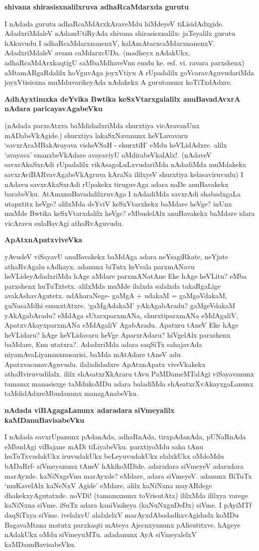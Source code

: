 {\bf shivana shirasisxnalilxruva adhaRcaMdarxda gurutu}

I nAdada gurutu adhaRcaMdArxkAraveMdu hiMdeyeV tiLisidAdxgide. AdadxriMdaleV nAdamUtiRyAda shivana shirasisxnalilx- jaTeyalilx gurutu hAkuvudu I adhaRcaMdarxnanenxV, kalAmAtarxcaMdarxnanenxV. AdadxriMdaleV avanu caMdarxcUDa. (madheyx nAdakUkx, adhaRcaMdArxkaqtigU saMbaMdhaveVnu emdu ke. esf. vi. ravara parxshenx) aMtamARgaRdalilx hoVguvAga joyxVtiyu A rUpadalilx goVcaravAguvudariMda joyxVtisisxna muMduvarikeyAda nAdakekx A gurutanunx koTiTxdAdxre.

{\bf AdhAyxtimxka deYvika Bwtika keSxVtarxgalalilx anuBavadAvxrA nAdara paricayavAgabeVku}

(nAdada parxsAtxva baMdidadxriMda shurxtiya vicAravanUnx mADabeVkAgide.) shurxtiya lakaSxNavanunx heVLuvavaru `savxrAraMBakAvayava visheVSaH - shurxtiH' eMdu heVLidAdxre. alilx `avayava' enanxbeVkAdare avayaviyU oMdirabeVkalAlx!. (nAdaveV savxrAkaSxrAdi rUpadalilx vikAsagoLuLxvudariMda nAdadiMda muMdakekx savxrAviBARvavAgabeVkAgruva kAraNa ililxyeV shurxtiya kelasaviruvudu) I nAdavu savxrAkaSxrAdi rUpakekx tiruguvAga adara naDe anuBavakekx barabeVku. AtAmxnuBavadalilxruvAga I nAdadiMda savxrAdi shabadxgaLa utapxtitx heVge? alilxMda deYviV keSxVtarxkekx baMdare heVge? inUnx muMde Bwtika keSxVtarxdalilx heVge? eMbudelAlx anuBavakekx baMdare idara vicAravu sulaBavAgi athaRvAguvudu.

{\bf ApAtxnApatxviveVka}

yAvudeV viSayavU anuBavakekx baMdAga adara neYsagiRkate, neYjate athaRvAgalu sAdhayx. adanunx biTutx keVvala parxmANavu heVLideyAdadxriMda hAge aMdare parxmANatAne Eke hAge heVLitu? eMba parxshenx huTuTxtetx. alilxMda muMde ilalxda salalxda takaRgaLige avakAshavAgutetx. udAharaNege- gaMgA + udakaM = gaMgoVdakaM, guNasaMdhi enunxtAtxre. `gaMgAdakaM' yAkAgabAradu? gaMgeVdakaM yAkAgabAradu? eMdAga sUtarxparxmANa, shurxtiparxmANa eMdAgaliV, ApatxvAkayxparxmANa eMdAgaliV AgabAradu. Apatxru tAneV Eke hAge heVLidaru? hAge heVLidavaru heVge AparxrAdaru? hiVgelAlx parxshenx baMdare, Enu utatxra?. AdadxriMda adara saqSiTx sahajavAda niyamAvaLiyananxnusarisi, baMda mAtAdare tAneV adu ApatxvacanavAguvudu. ilalxdidadxre ApAtxnApatx viveVkakekx athaRviruvudilalx. ililx shAsatxrXkAraru tAvu PaMDameMTalAgi viSayavanunx tamamx manasisxge taMdukoMDu adara baladiMda shAsatxrXvAkayxgaLanunx taMdidAdxreMbudanunx managAnabeVku.

{\bf nAdada viBAgagaLanunx adaradara siVmeyalilx kaMDanuBavisabeVku}

I nAdada savxrUpanunx pAdanAda, adhaRnAda, tirxpAdanAda, pUNaRnAda eMbudAgi viBajane mADi tiLiyabeVku. parxtiyoMdu saha tAnu huTuTxvudakUkx iruvudakUkx beLeyuvudakUkx elalxkUkx oMdoMdu bADaRrf- siVmeyanunx tAneV hAkikoMDide. adaradara siVmeyeV adaradara marAyxde. kaNiNxgeVnu marAyxde? eMdare, adara siVmeyeV. adanunx BiTuTx `muKavelAlx kaNeNxV Agide' eMdare, alilx kaNiNxna mayARdege dhakekxyAgutatxde. noVDi! (tamamxnunx toVrisutAtx) ililxMda ililxya varege kaNiNxna siVme. iSuTx adara kaniVnikeya (kaNuNxguDeDx) siVme. I pAyiMTf daqSiTxya siVme. ivelalxvU alalxlelxV marAyxdAbadadhxvAgidudx koMDu BagavaMtana matutx parxkaqti mAteya Ajecnxyanunx pAlisutitxve. hAgeye nAdakUkx oMdu siVmeyuMTu. adadanunx AyA siVmeyalelxV kaMDanuBavisabeVku.

